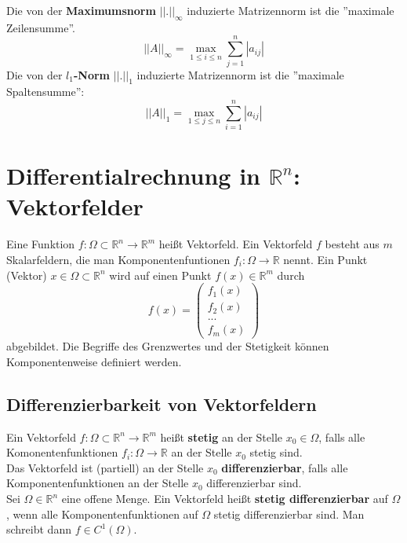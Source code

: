\documentclass[a4paper,twocolumn,10pt]{article}
\begin{document}
Die von der \textbf{Maximumsnorm} $||.||_{\infty}$ induzierte Matrizennorm ist die ''maximale Zeilensumme''.
\begin{equation*}
||A||_{\infty}=\max\limits_{1\leq i\leq n}\sum\limits_{j=1}^{n}|a_{ij}|
\end{equation*}
Die von der \textbf{$l_1$-Norm} $||.||_1$ induzierte Matrizennorm ist die ''maximale Spaltensumme'':
\begin{equation*}
||A||_1=\max\limits_{1\leq j\leq n}\sum\limits_{i=1}^{n}|a_{ij}|
\end{equation*}

\section{Differentialrechnung in $\mathbb{R}^n$: Vektorfelder}
Eine Funktion $f:\Omega\subset \mathbb{R}^n\rightarrow\mathbb{R}^m$ heißt Vektorfeld. Ein Vektorfeld $f$ besteht aus $m$ Skalarfeldern, die man Komponentenfuntionen $f_i:\Omega\rightarrow\mathbb{R}$ nennt. Ein Punkt (Vektor) $x\in\Omega\subset\mathbb{R}^n$ wird auf einen Punkt $f(x)\in\mathbb{R}^m$ durch
\begin{equation*}
f(x)=\begin{pmatrix}f_1(x) \\ f_2(x) \\ ... \\ f_m(x)\end{pmatrix}
\end{equation*}
abgebildet. Die Begriffe des Grenzwertes und der Stetigkeit können Komponentenweise definiert werden.

\subsection{Differenzierbarkeit von Vektorfeldern}
Ein Vektorfeld $f:\Omega\subset\mathbb{R}^n\rightarrow\mathbb{R}^m$ heißt \textbf{stetig} an der Stelle $x_0\in\Omega$, falls alle Komonentenfunktionen $f_i:\Omega\rightarrow\mathbb{R}$ an der Stelle $x_0$ stetig sind.\\
Das Vektorfeld ist (partiell) an der Stelle $x_0$ \textbf{differenzierbar}, falls alle Komponentenfunktionen an der Stelle $x_0$ differenzierbar sind.\\
Sei $\Omega\in\mathbb{R}^n$ eine offene Menge. Ein Vektorfeld heißt \textbf{stetig differenzierbar} auf $\Omega$, wenn alle Komponentenfunktionen auf $\Omega$ stetig differenzierbar sind. Man schreibt dann $f\in C^1(\Omega)$.
\end{document}
